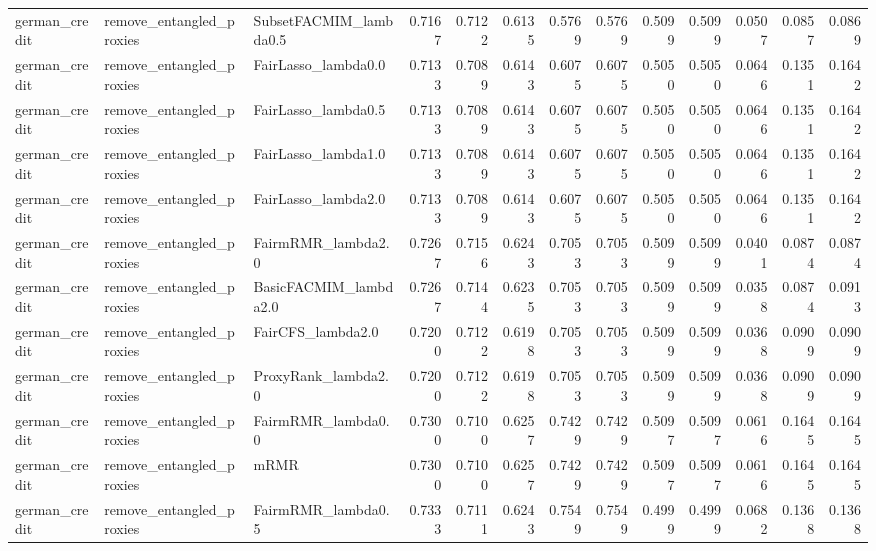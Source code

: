 \begin{tabular}{lllrrrrrrrrrr}
german_credit & remove_entangled_proxies & SubsetFACMIM_lambda0.5 & 0.7167 & 0.7122 & 0.6135 & 0.5769 & 0.5769 & 0.5099 & 0.5099 & 0.0507 & 0.0857 & 0.0869 \\
german_credit & remove_entangled_proxies & FairLasso_lambda0.0 & 0.7133 & 0.7089 & 0.6143 & 0.6075 & 0.6075 & 0.5050 & 0.5050 & 0.0646 & 0.1351 & 0.1642 \\
german_credit & remove_entangled_proxies & FairLasso_lambda0.5 & 0.7133 & 0.7089 & 0.6143 & 0.6075 & 0.6075 & 0.5050 & 0.5050 & 0.0646 & 0.1351 & 0.1642 \\
german_credit & remove_entangled_proxies & FairLasso_lambda1.0 & 0.7133 & 0.7089 & 0.6143 & 0.6075 & 0.6075 & 0.5050 & 0.5050 & 0.0646 & 0.1351 & 0.1642 \\
german_credit & remove_entangled_proxies & FairLasso_lambda2.0 & 0.7133 & 0.7089 & 0.6143 & 0.6075 & 0.6075 & 0.5050 & 0.5050 & 0.0646 & 0.1351 & 0.1642 \\
german_credit & remove_entangled_proxies & FairmRMR_lambda2.0 & 0.7267 & 0.7156 & 0.6243 & 0.7053 & 0.7053 & 0.5099 & 0.5099 & 0.0401 & 0.0874 & 0.0874 \\
german_credit & remove_entangled_proxies & BasicFACMIM_lambda2.0 & 0.7267 & 0.7144 & 0.6235 & 0.7053 & 0.7053 & 0.5099 & 0.5099 & 0.0358 & 0.0874 & 0.0913 \\
german_credit & remove_entangled_proxies & FairCFS_lambda2.0 & 0.7200 & 0.7122 & 0.6198 & 0.7053 & 0.7053 & 0.5099 & 0.5099 & 0.0368 & 0.0909 & 0.0909 \\
german_credit & remove_entangled_proxies & ProxyRank_lambda2.0 & 0.7200 & 0.7122 & 0.6198 & 0.7053 & 0.7053 & 0.5099 & 0.5099 & 0.0368 & 0.0909 & 0.0909 \\
german_credit & remove_entangled_proxies & FairmRMR_lambda0.0 & 0.7300 & 0.7100 & 0.6257 & 0.7429 & 0.7429 & 0.5097 & 0.5097 & 0.0616 & 0.1645 & 0.1645 \\
german_credit & remove_entangled_proxies & mRMR & 0.7300 & 0.7100 & 0.6257 & 0.7429 & 0.7429 & 0.5097 & 0.5097 & 0.0616 & 0.1645 & 0.1645 \\
german_credit & remove_entangled_proxies & FairmRMR_lambda0.5 & 0.7333 & 0.7111 & 0.6243 & 0.7549 & 0.7549 & 0.4999 & 0.4999 & 0.0682 & 0.1368 & 0.1368 \\
\bottomrule
\end{tabular}
